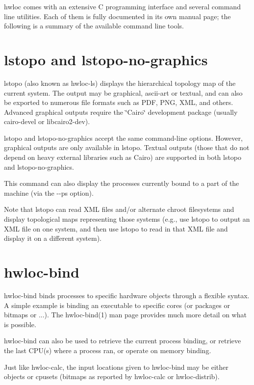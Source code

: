 

hwloc comes with an extensive C programming interface and several command line utilities. Each of them is fully documented in its own manual page; the following is a summary of the available command line tools.

 \hypertarget{a00381_cli_lstopo}{}\section{lstopo and lstopo-\/no-\/graphics}\label{a00381_cli_lstopo}
lstopo (also known as hwloc-\/ls) displays the hierarchical topology map of the current system. The output may be graphical, ascii-\/art or textual, and can also be exported to numerous file formats such as P\+DF, P\+NG, X\+ML, and others. Advanced graphical outputs require the \char`\"{}\+Cairo\char`\"{} development package (usually {\ttfamily cairo-\/devel} or {\ttfamily libcairo2-\/dev}).

lstopo and lstopo-\/no-\/graphics accept the same command-\/line options. However, graphical outputs are only available in lstopo. Textual outputs (those that do not depend on heavy external libraries such as Cairo) are supported in both lstopo and lstopo-\/no-\/graphics.

This command can also display the processes currently bound to a part of the machine (via the {\ttfamily -\/-\/ps} option).

Note that lstopo can read X\+ML files and/or alternate chroot filesystems and display topological maps representing those systems (e.\+g., use lstopo to output an X\+ML file on one system, and then use lstopo to read in that X\+ML file and display it on a different system).

 \hypertarget{a00381_cli_hwloc_bind}{}\section{hwloc-\/bind}\label{a00381_cli_hwloc_bind}
hwloc-\/bind binds processes to specific hardware objects through a flexible syntax. A simple example is binding an executable to specific cores (or packages or bitmaps or ...). The hwloc-\/bind(1) man page provides much more detail on what is possible.

hwloc-\/bind can also be used to retrieve the current process\textquotesingle{} binding, or retrieve the last C\+P\+U(s) where a process ran, or operate on memory binding.

Just like hwloc-\/calc, the input locations given to hwloc-\/bind may be either objects or cpusets (bitmaps as reported by hwloc-\/calc or hwloc-\/distrib).

